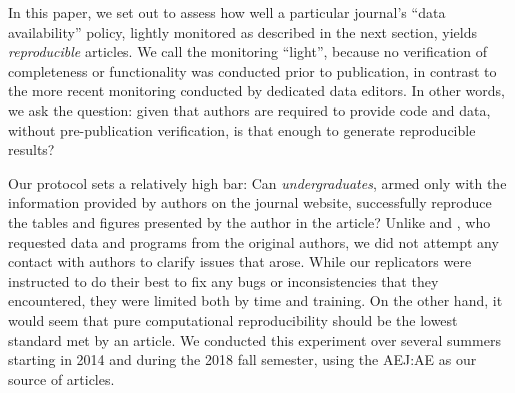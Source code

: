 In this paper,  we set out to assess how well a particular journal's ``data availability'' policy, lightly monitored as described in the next section, yields \textit{reproducible} articles. We call the monitoring ``light'', because no verification of completeness or functionality was conducted prior to publication, in contrast to the more recent monitoring conducted by dedicated data editors. In other words, we ask the question: given that authors are required to provide code and data, without pre-publication verification, is that enough to generate reproducible results?


%


Our protocol sets a relatively high bar: Can \textit{undergraduates}, armed only with the information provided by authors on the journal website, successfully reproduce the tables and figures presented by the author in the article? Unlike \textcite{Dewald1986} and \textcite{McCullough03}, who requested data and programs from the original authors, we did not attempt any contact with authors to clarify issues that arose. While our replicators were instructed to do their best to fix any bugs or inconsistencies that they encountered, they were limited both by time and training. On the other hand, it would seem that pure computational reproducibility should be the lowest standard met by an article.
We conducted this experiment over several summers starting in 2014 and during the 2018 fall semester, using the \ac{AEJ:AE} as our source of articles.

